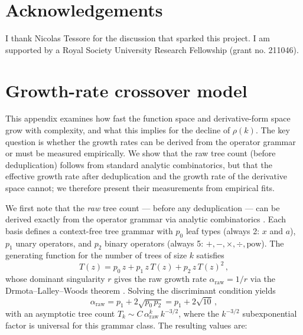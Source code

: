 \documentclass[preprint,12pt,authoryear]{elsarticle}
\newcommand{\rhok}{\rho(k)}
\begin{document}
\section*{Acknowledgements}

I thank Nicolas Tessore for the discussion that sparked this project. I am supported by a Royal Society University Research Fellowship (grant no. 211046).

\appendix

\section{Growth-rate crossover model}
\label{app:model}


This appendix examines how fast the function space and derivative-form space grow with complexity, and what this implies for the decline of $\rhok$. The key question is whether the growth rates can be derived from the operator grammar or must be measured empirically. We show that the raw tree count (before deduplication) follows from standard analytic combinatorics, but that the effective growth rate after deduplication and the growth rate of the derivative space cannot; we therefore present their measurements from empirical fits.

We first note that the \emph{raw} tree count --- before any deduplication --- can be derived exactly from the operator grammar via analytic combinatorics \citep{FlajoletSedgewick2009}. Each basis defines a context-free tree grammar with $p_0$ leaf types (always 2: $x$ and $a$), $p_1$ unary operators, and $p_2$ binary operators (always 5: $+, -, \times, \div, \mathrm{pow}$). The generating function for the number of trees of size $k$ satisfies
\[
T(z) = p_0\,z + p_1\,z\,T(z) + p_2\,z\,T(z)^2\,,
\]
whose dominant singularity $r$ gives the raw growth rate $\alpha_{\mathrm{raw}} = 1/r$ via the Drmota--Lalley--Woods theorem \citep{FlajoletSedgewick2009}. Solving the discriminant condition yields
\[
\alpha_{\mathrm{raw}} = p_1 + 2\sqrt{p_0\,p_2} = p_1 + 2\sqrt{10}\,,
\]
with an asymptotic tree count $T_k \sim C\,\alpha_{\mathrm{raw}}^k\,k^{-3/2}$, where the $k^{-3/2}$ subexponential factor is universal for this grammar class. The resulting values are:
\end{document}
